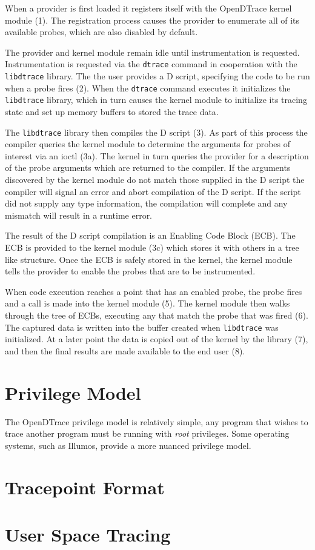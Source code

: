 When a provider is first loaded it registers itself with the
OpenDTrace kernel module (1). The registration process causes the
provider to enumerate all of its available probes, which are also
disabled by default.

The provider and kernel module remain idle until instrumentation is
requested. Instrumentation is requested via the \texttt{dtrace}
command in cooperation with the \texttt{libdtrace} library.  The the
user provides a D script, specifying the code to be run when a probe
fires (2). When the \texttt{dtrace} command executes it initializes
the \texttt{libdtrace} library, which in turn causes the kernel module
to initialize its tracing state and set up memory buffers to stored
the trace data.

The \texttt{libdtrace} library then compiles the D script (3). As part
of this process the compiler queries the kernel module to determine
the arguments for probes of interest via an ioctl (3a). The kernel in
turn queries the provider for a description of the probe arguments
which are returned to the compiler.  If the arguments discovered by
the kernel module do not match those supplied in the D script the
compiler will signal an error and abort compilation of the D script.
If the script did not supply any type information, the compilation
will complete and any mismatch will result in a runtime error.

The result of the D script compilation is an Enabling Code Block
(ECB). The ECB is provided to the kernel module (3c) which stores it
with others in a tree like structure. Once the ECB is safely stored in
the kernel, the kernel module tells the provider to enable the probes
that are to be instrumented.

When code execution reaches a point that has an enabled probe, the
probe fires and a call is made into the kernel module (5). The kernel
module then walks through the tree of ECBs, executing any that match
the probe that was fired (6). The captured data is written into the
buffer created when \texttt{libdtrace} was initialized. At a later
point the data is copied out of the kernel by the library (7), and
then the final results are made available to the end user (8).

\section{Privilege Model}
\label{sec:privilege}

The OpenDTrace privilege model is relatively simple, any program that
wishes to trace another program must be running with \emph{root}
privileges.  Some operating systems, such as Illumos, provide a more
nuanced privilege model.

\section{Tracepoint Format}
\label{sec:tracepoint-format}

\section{User Space Tracing}
\label{sec:user-space}


